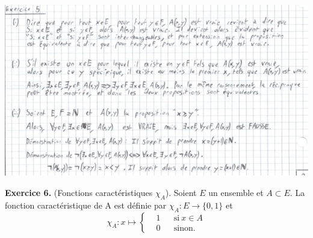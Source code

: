 \documentclass[a4paper, 10pt]{report}
\begin{document}
	\includegraphics{ex05.jpg}
	
	\vspace{5mm}
	\noindent
	\textbf{Exercice 6.} (Fonctions caractéristiques $\chi_A$).
	Soient $E$ un ensemble et $A \subset E$. La fonction
	caractéristique de A est définie par $\chi_A : E \to \{0, 1\}$ et
	\[
		\chi_A : x \mapsto \left\{
		\begin{aligned}
			&1 & &\text{si}\ x \in A\\
			&0 & &\text{sinon.}
		\end{aligned}
		\right.
	\]
	
\end{document}
